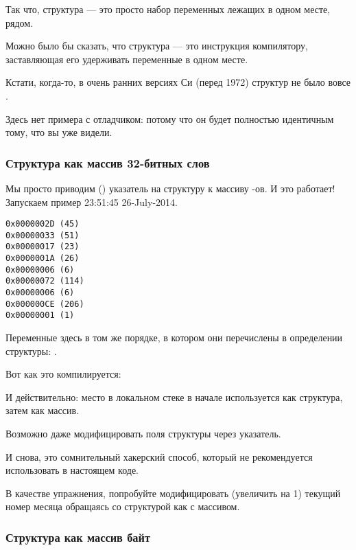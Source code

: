 Так что, структура --- это просто набор переменных лежащих в одном месте, рядом.

Можно было бы сказать, что структура --- это инструкция компилятору, заставляющая его удерживать переменные в одном месте.

Кстати, когда-то, в очень ранних версиях Си (перед 1972) структур не было вовсе \RitchieDevC.

Здесь нет примера с отладчиком: потому что он будет полностью идентичным тому, что вы уже видели.

\subsubsection{Структура как массив 32-битных слов}



Мы просто приводим () указатель на структуру к массиву \Tint{}-ов.
И это работает!
Запускаем пример 23:51:45 26-July-2014.

\begin{lstlisting}[label=GCC_tm3_output]
0x0000002D (45)
0x00000033 (51)
0x00000017 (23)
0x0000001A (26)
0x00000006 (6)
0x00000072 (114)
0x00000006 (6)
0x000000CE (206)
0x00000001 (1)
\end{lstlisting}

Переменные здесь в том же порядке, в котором они перечислены в определении структуры: .

Вот как это компилируется:



И действительно: место в локальном стеке в начале используется как структура, затем как массив.

Возможно даже модифицировать поля структуры через указатель.

И снова, это сомнительный хакерский способ, который не рекомендуется использовать в настоящем коде.

\mysubparagraph{\Exercise}

В качестве упражнения, попробуйте модифицировать (увеличить на 1) 
текущий номер месяца обращаясь со структурой как с массивом.

\subsubsection{Структура как массив байт}

